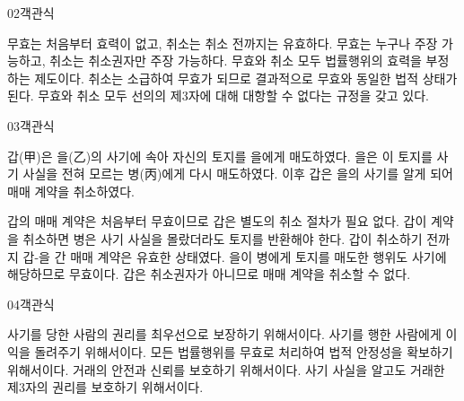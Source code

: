 \documentclass[fs85,seriesWit]{korfarm-base}
\begin{document}
\begin{kfQBlock}{02}{객관식}
\begin{kfChoices}
\kfChoice 무효는 처음부터 효력이 없고, 취소는 취소 전까지는 유효하다.
\kfChoice 무효는 누구나 주장 가능하고, 취소는 취소권자만 주장 가능하다.
\kfChoice 무효와 취소 모두 법률행위의 효력을 부정하는 제도이다.
\kfChoice 취소는 소급하여 무효가 되므로 결과적으로 무효와 동일한 법적 상태가 된다.
\kfChoice 무효와 취소 모두 선의의 제3자에 대해 대항할 수 없다는 규정을 갖고 있다.
\end{kfChoices}
\end{kfQBlock}

\begin{kfQBlock}{03}{객관식}
\begin{kfEvidence}갑(甲)은 을(乙)의 사기에 속아 자신의 토지를 을에게 매도하였다. 을은 이 토지를 사기 사실을 전혀 모르는 병(丙)에게 다시 매도하였다. 이후 갑은 을의 사기를 알게 되어 매매 계약을 취소하였다.\end{kfEvidence}
\begin{kfChoices}
\kfChoice 갑의 매매 계약은 처음부터 무효이므로 갑은 별도의 취소 절차가 필요 없다.
\kfChoice 갑이 계약을 취소하면 병은 사기 사실을 몰랐더라도 토지를 반환해야 한다.
\kfChoice 갑이 취소하기 전까지 갑-을 간 매매 계약은 유효한 상태였다.
\kfChoice 을이 병에게 토지를 매도한 행위도 사기에 해당하므로 무효이다.
\kfChoice 갑은 취소권자가 아니므로 매매 계약을 취소할 수 없다.
\end{kfChoices}
\end{kfQBlock}

\begin{kfQBlock}{04}{객관식}
\begin{kfChoices}
\kfChoice 사기를 당한 사람의 권리를 최우선으로 보장하기 위해서이다.
\kfChoice 사기를 행한 사람에게 이익을 돌려주기 위해서이다.
\kfChoice 모든 법률행위를 무효로 처리하여 법적 안정성을 확보하기 위해서이다.
\kfChoice 거래의 안전과 신뢰를 보호하기 위해서이다.
\kfChoice 사기 사실을 알고도 거래한 제3자의 권리를 보호하기 위해서이다.
\end{kfChoices}
\end{kfQBlock}

\kfEndMC
\end{document}
